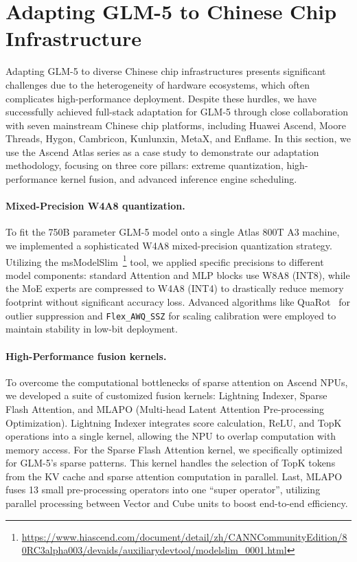 \section{Adapting GLM-5 to Chinese Chip Infrastructure}
\label{sec:chinese}

Adapting GLM-5 to diverse Chinese chip infrastructures presents significant challenges due to the heterogeneity of hardware ecosystems, which often complicates high-performance deployment. Despite these hurdles, we have successfully achieved full-stack adaptation for GLM-5 through close collaboration with seven mainstream Chinese chip platforms, including Huawei Ascend, Moore Threads, Hygon, Cambricon, Kunlunxin, MetaX, and Enflame. In this section, we use the Ascend Atlas series as a case study to demonstrate our adaptation methodology, focusing on three core pillars: extreme quantization, high-performance kernel fusion, and advanced inference engine scheduling.

\paragraph{Mixed-Precision W4A8 quantization.}
To fit the 750B parameter GLM-5 model onto a single Atlas 800T A3 machine, we implemented a sophisticated W4A8 mixed-precision quantization strategy. Utilizing the msModelSlim~\footnote{\url{https://www.hiascend.com/document/detail/zh/CANNCommunityEdition/80RC3alpha003/devaids/auxiliarydevtool/modelslim_0001.html}} tool, we applied specific precisions to different model components: standard Attention and MLP blocks use W8A8 (INT8), while the MoE experts are compressed to W4A8 (INT4) to drastically reduce memory footprint without significant accuracy loss. Advanced algorithms like QuaRot~\cite{ashkboos2024quarotoutlierfree4bitinference} for outlier suppression and \texttt{Flex\_AWQ\_SSZ} for scaling calibration were employed to maintain stability in low-bit deployment.

\paragraph{High-Performance fusion kernels.}
To overcome the computational bottlenecks of sparse attention on Ascend NPUs, we developed a suite of customized fusion kernels: Lightning Indexer, Sparse Flash Attention, and MLAPO (Multi-head Latent Attention Pre-processing Optimization). 
Lightning Indexer integrates score calculation, ReLU, and TopK operations into a single kernel, allowing the NPU to overlap computation with memory access.
For the Sparse Flash Attention kernel, we specifically optimized for GLM-5's sparse patterns. This kernel handles the selection of TopK tokens from the KV cache and sparse attention computation in parallel.
Last, MLAPO fuses 13 small pre-processing operators into one ``super operator'', utilizing parallel processing between Vector and Cube units to boost end-to-end efficiency.


